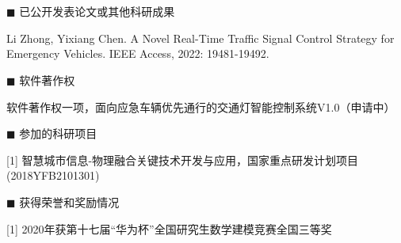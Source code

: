 \newpage
\section*{}
\vskip 5mm

{\heiti $\blacksquare$ 已公开发表论文或其他科研成果}\vskip 5mm
\begin{flushleft}
[1] Li Zhong, Yixiang Chen. A Novel Real-Time Traffic Signal Control Strategy for Emergency Vehicles. IEEE Access, 2022: 19481-19492. 

\end{flushleft}

{\heiti $\blacksquare$ 软件著作权}\vskip 5mm
\begin{flushleft}
[1] 软件著作权一项，面向应急车辆优先通行的交通灯智能控制系统V1.0（申请中）
\end{flushleft}

{\heiti $\blacksquare$ 参加的科研项目}\vskip 5mm
\begin{flushleft}
	
[1] 智慧城市信息$\!$-物理融合关键技术开发与应用，国家重点研发计划项目(2018YFB2101301)

	
\end{flushleft}
 
 {\heiti $\blacksquare$ 获得荣誉和奖励情况}\vskip 5mm
 \begin{flushleft}
 	
 	[1] 2020年获第十七届“华为杯”全国研究生数学建模竞赛全国三等奖
 	
 	
 \end{flushleft}